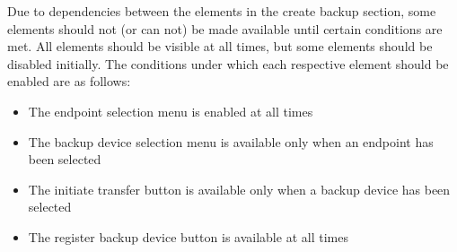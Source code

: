 Due to dependencies between the elements in the create backup section, some elements
should not (or can not) be made available until certain conditions are met. All elements 
should be visible at all times, but some elements should be disabled initially. The 
conditions under which each respective element should be enabled are as follows:

\begin{itemize}\itemsep1pt
  \item The endpoint selection menu is enabled at all times
  \item The backup device selection menu is available only when an endpoint has been
  selected
  \item The initiate transfer button is available only when a backup device has been
  selected
  \item The register backup device button is available at all times 
\end{itemize}


